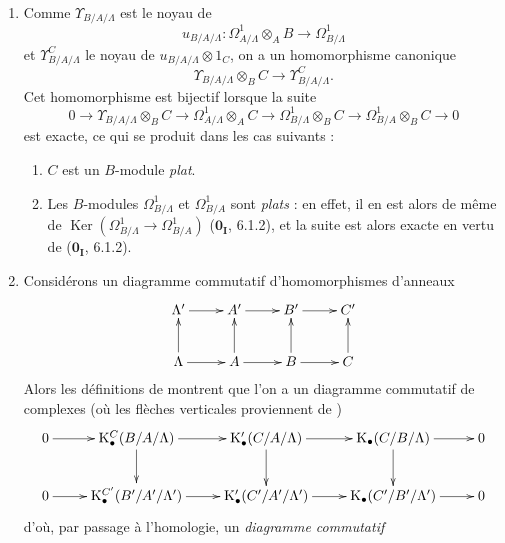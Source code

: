 \begin{remarks}[20.6.21]
\label{0.20.6.21-fr}
\begin{enumerate}
  \item[\rm(i)] Comme $\Upsilon_{B/A/\Lambda}$ est le noyau de
  \[
    u_{B/A/\Lambda}:\Omega^1_{A/\Lambda}\otimes_A B
    \to\Omega^1_{B/\Lambda}
  \]
  et $\Upsilon^C_{B/A/\Lambda}$ le noyau de
  $u_{B/A/\Lambda}\otimes1_C$, on a un homomorphisme canonique
\begin{equation}
\tag{20.6.21.1}
\label{0.20.6.21.1-fr}
  \Upsilon_{B/A/\Lambda}\otimes_B C\to\Upsilon^C_{B/A/\Lambda}.
\end{equation}
Cet homomorphisme est bijectif lorsque la suite
\begin{equation}
\tag{20.6.21.2}
\label{0.20.6.21.2-fr}
  0\to\Upsilon_{B/A/\Lambda}\otimes_B C\to
  \Omega^1_{A/\Lambda}\otimes_A C\to
  \Omega^1_{B/\Lambda}\otimes_B C\to
  \Omega^1_{B/A}\otimes_B C\to0
\end{equation}
est exacte, ce qui se produit dans les cas suivants :
\begin{enumerate}
  \item[$1^\circ$] $C$ est un $B$-module \emph{plat}.
  \item[$2^\circ$] Les $B$-modules $\Omega^1_{B/\Lambda}$ et
  $\Omega^1_{B/A}$ sont \emph{plats} : en effet, il en est alors de même de
  $\operatorname{Ker}(\Omega^1_{B/\Lambda}\to\Omega^1_{B/A})$
  ($\mathbf{0_I}$, 6.1.2), et la suite  est alors
  exacte en vertu de ($\mathbf{0_I}$, 6.1.2).
\end{enumerate}
  \item[\rm(ii)] Considérons un diagramme commutatif d'homomorphismes
  d'anneaux
\[
\xymatrix{
  \Lambda' \ar[r] & A' \ar[r] & B' \ar[r] & C' \\
  \Lambda \ar[u] \ar[r] & A \ar[u] \ar[r] & B \ar[u] \ar[r] & C \ar[u]
}
\]
Alors les définitions de  montrent que l'on a un
diagramme commutatif de complexes (où les flèches verticales proviennent de
)
\[
\xymatrix{
  0 \ar[r] & \mathrm{K}^C_\bullet(B/A/\Lambda) \ar[r] \ar[d] &
  \mathrm{K}'_\bullet(C/A/\Lambda) \ar[r] \ar[d] &
  \mathrm{K}_\bullet(C/B/\Lambda) \ar[r] \ar[d] & 0 \\
  0 \ar[r] & \mathrm{K}^{C'}_\bullet(B'/A'/\Lambda') \ar[r] &
  \mathrm{K}'_\bullet(C'/A'/\Lambda') \ar[r] &
  \mathrm{K}_\bullet(C'/B'/\Lambda') \ar[r] & 0
}
\]
d'où, par passage à l'homologie, un \emph{diagramme commutatif}
\begin{equation}

\end{equation}
\end{enumerate}
\end{remarks}
